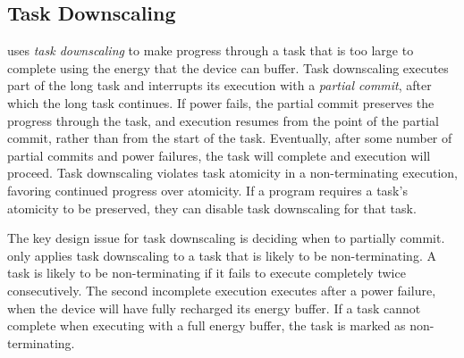 \subsection{Task Downscaling}
\label{sec:task_downsizing}

\sys uses {\em task downscaling} to make progress through a task that is too large to complete using the energy that the device can buffer. Task downscaling executes part of the long task and interrupts its execution with a {\em partial commit}, after which the long task continues. If power fails, the partial commit preserves the progress through the task, and execution resumes from the point of the partial commit, rather than from the start of the task. Eventually, after some number of partial commits and power failures, the task will complete and execution will proceed. Task downscaling violates task atomicity in a non-terminating execution, favoring continued progress over atomicity. If a program requires a task's atomicity to be preserved, they can disable task downscaling for that task.

The key design issue for task downscaling is deciding when to partially commit. \sys only applies task downscaling to a task that is likely to be non-terminating.  A task is likely to be non-terminating if it fails to execute completely twice consecutively. The second incomplete execution executes after a power failure, when the device will have fully recharged its energy buffer. If a task cannot complete when executing with a full energy buffer, the task is marked as non-terminating.

